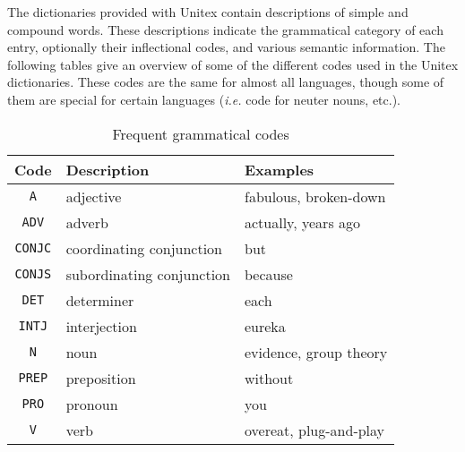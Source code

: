 The dictionaries provided with Unitex contain descriptions of simple and compound
words. These descriptions indicate the grammatical category of each entry,
optionally their inflectional codes, and various semantic information. The
following tables give an overview of some of the different codes used in the 
Unitex dictionaries. These codes are the same for almost all languages, though
some of them are special for certain languages (\textit{i.e.} code for neuter
nouns, etc.).

\begin{table}[!ht]
\begin{center}
\begin{tabular}{|c|l|l|}
\hline
\textbf{Code} & \textbf{Description} & \textbf{Examples} \\
\hline
\verb+A+ & adjective & fabulous, broken-down \\
\hline
\verb+ADV+ & adverb & actually, years ago \\
\hline
\verb+CONJC+ & coordinating conjunction & but\\
\hline
\verb+CONJS+ & subordinating conjunction & because \\
\hline
\verb+DET+ & determiner & each \\
\hline
\verb+INTJ+ & interjection & eureka \\
\hline
\verb+N+ & noun & evidence, group theory \\
\hline
\verb+PREP+ & preposition & without \\
\hline
\verb+PRO+ & pronoun & you \\
\hline
\verb+V+ & verb & overeat, plug-and-play \\
\hline
\end{tabular}
\caption{Frequent grammatical codes\label{tab-grammatical-codes}}
\end{center}
\end{table}

